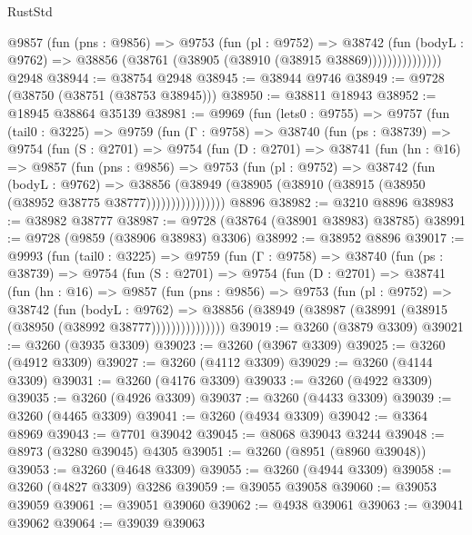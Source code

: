 \begin{lexlean}{RustStd}
\begin{coremodule}
                  @9857
                    (fun (pns : @9856) =>
                    @9753
                      (fun (pl : @9752) =>
                      @38742
                        (fun (bodyL : @9762) =>
                        @38856 (@38761 (@38905 (@38910 (@38915 @38869)))))))))))))))
    @2948
@38944 := @38754 @2948
@38945 := @38944 @9746
@38949 := @9728 (@38750 (@38751 (@38753 @38945)))
@38950 := @38811 @18943
@38952 := @18945 @38864 @35139
@38981 := @9969
    (fun (lets0 : @9755) =>
    @9757
      (fun (tail0 : @3225) =>
      @9759
        (fun (Γ : @9758) =>
        @38740
          (fun (ps : @38739) =>
          @9754
            (fun (S : @2701) =>
            @9754
              (fun (D : @2701) =>
              @38741
                (fun (hn : @16) =>
                @9857
                  (fun (pns : @9856) =>
                  @9753
                    (fun (pl : @9752) =>
                    @38742
                      (fun (bodyL : @9762) =>
                      @38856
                        (@38949
                          (@38905 (@38910 (@38915 (@38950 (@38952 @38775 @38777))))))))))))))))
    @8896
@38982 := @3210 @8896
@38983 := @38982 @38777
@38987 := @9728 (@38764 (@38901 @38983) @38785)
@38991 := @9728 (@9859 (@38906 @38983) @3306)
@38992 := @38952 @8896
@39017 := @9993
    (fun (tail0 : @3225) =>
    @9759
      (fun (Γ : @9758) =>
      @38740
        (fun (ps : @38739) =>
        @9754
          (fun (S : @2701) =>
          @9754
            (fun (D : @2701) =>
            @38741
              (fun (hn : @16) =>
              @9857
                (fun (pns : @9856) =>
                @9753
                  (fun (pl : @9752) =>
                  @38742
                    (fun (bodyL : @9762) =>
                    @38856 (@38949 (@38987 (@38991 (@38915 (@38950 (@38992 @38777)))))))))))))))
@39019 := @3260 (@3879 @3309)
@39021 := @3260 (@3935 @3309)
@39023 := @3260 (@3967 @3309)
@39025 := @3260 (@4912 @3309)
@39027 := @3260 (@4112 @3309)
@39029 := @3260 (@4144 @3309)
@39031 := @3260 (@4176 @3309)
@39033 := @3260 (@4922 @3309)
@39035 := @3260 (@4926 @3309)
@39037 := @3260 (@4433 @3309)
@39039 := @3260 (@4465 @3309)
@39041 := @3260 (@4934 @3309)
@39042 := @3364 @8969
@39043 := @7701 @39042
@39045 := @8068 @39043 @3244
@39048 := @8973 (@3280 @39045) @4305
@39051 := @3260 (@8951 (@8960 @39048))
@39053 := @3260 (@4648 @3309)
@39055 := @3260 (@4944 @3309)
@39058 := @3260 (@4827 @3309) @3286
@39059 := @39055 @39058
@39060 := @39053 @39059
@39061 := @39051 @39060
@39062 := @4938 @39061
@39063 := @39041 @39062
@39064 := @39039 @39063

\end{coremodule}
\end{lexlean}

